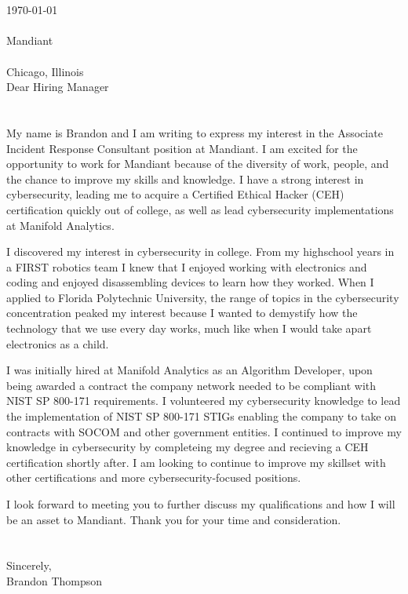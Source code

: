 \documentclass{resume} %
\newcommand\company{Mandiant}
\newcommand\position{Associate Incident Response Consultant}
\newcommand\location{Chicago, Illinois}
\begin{document}

\begin{rSection}{}
\ \\\
\\
\today \\
\\
\company{}\\
\\
\location{}\\

Dear Hiring Manager\\
\\
\\
My name is Brandon and I am writing to express my interest in the \position{} position at \company{}.
I am excited for the opportunity to work for \company{} because of the diversity of work, people, and the chance to improve my skills and knowledge.
I have a strong interest in cybersecurity, leading me to acquire a Certified Ethical Hacker (CEH) certification quickly out of college, as well as lead cybersecurity implementations at Manifold Analytics.

I discovered my interest in cybersecurity in college. From my highschool years in a FIRST robotics team I knew that I enjoyed working with electronics and coding and enjoyed disassembling devices to learn how they worked. When I applied to Florida Polytechnic University, the range of topics in the cybersecurity concentration peaked my interest because I wanted to demystify how the technology that we use every day works, much like when I would take apart electronics as a child.

I was initially hired at Manifold Analytics as an Algorithm Developer, upon being awarded a contract the company network needed to be compliant with NIST SP 800-171 requirements. I volunteered my cybersecurity knowledge to lead the implementation of NIST SP 800-171 STIGs enabling the company to take on contracts with SOCOM and other government entities. I continued to improve my knowledge in cybersecurity by completeing my degree and recieving a CEH certification shortly after. I am looking to continue to improve my skillset with other certifications and more cybersecurity-focused positions.

I look forward to meeting you to further discuss my qualifications and how I will be an asset to \company{}.
Thank you for your time and consideration.
\\
\\
\\
Sincerely,\\
Brandon Thompson


\end{rSection}
\end{document}
